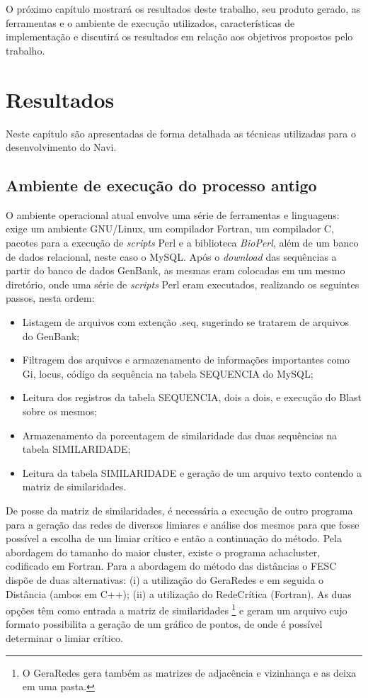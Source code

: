 O próximo capítulo mostrará os resultados deste trabalho, seu produto gerado, as ferramentas e o ambiente de execução utilizados, características
de implementação e discutirá os resultados em relação aos objetivos propostos pelo trabalho.

\chapter{Resultados}
\label{cap:resultados}

Neste capítulo são apresentadas de forma detalhada as técnicas utilizadas para o desenvolvimento do Navi.


\section{Ambiente de execução do processo antigo} \label{sec:ambiente}

O ambiente operacional atual envolve uma série de ferramentas e linguagens: exige um ambiente GNU/Linux, um compilador Fortran, um compilador C, pacotes para
a execução de \textit{scripts} Perl e a biblioteca \textit{BioPerl}, além de um banco de dados relacional, neste caso o MySQL. Após o \textit{download} das
sequências a partir do banco de dados GenBank, as mesmas eram colocadas em um mesmo diretório, onde uma série de \textit{scripts} Perl eram executados,
realizando os seguintes passos, nesta ordem:

\begin{itemize}
  \item{Listagem de arquivos com extenção .seq, sugerindo se tratarem de arquivos do GenBank;}
  \item{Filtragem dos arquivos e armazenamento de informações importantes como Gi, locus, código da sequência na tabela SEQUENCIA do MySQL;}
  \item{Leitura dos registros da tabela SEQUENCIA, dois a dois, e execução do Blast sobre os mesmos;}
  \item{Armazenamento da porcentagem de similaridade das duas sequências na tabela SIMILARIDADE;}
  \item{Leitura da tabela SIMILARIDADE e geração de um arquivo texto contendo a matriz de similaridades.}
\end{itemize}

De posse da matriz de similaridades, é necessária a execução de outro programa para a geração das redes de diversos limiares e análise dos mesmos para que
fosse possível a escolha de um limiar crítico e então a continuação do método. Pela abordagem do tamanho do maior cluster, existe o programa achacluster,
codificado em Fortran. Para a abordagem do método das distâncias o FESC dispõe de duas alternativas: (i) a utilização do GeraRedes e em seguida o
Distância (ambos em C++); (ii) a utilização do RedeCrítica (Fortran). As duas opções têm como entrada a matriz de similaridades \footnote{O GeraRedes 
gera também as matrizes de adjacência e vizinhança e as deixa em uma pasta.} e geram um arquivo cujo formato possibilita a geração de um gráfico de pontos,
de onde é possível determinar o limiar crítico.

